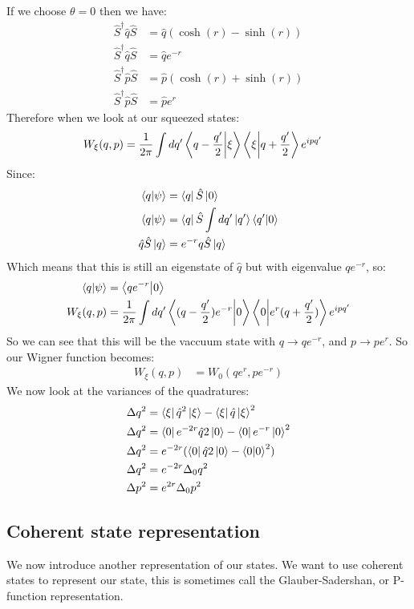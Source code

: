 If we choose $\theta = 0$ then we have:
\begin{align*}
	\hat{S}^\dagger \hat{q}\hat{S} &= \hat{q}(\cosh(r) - \sinh(r)) \\
	\hat{S}^\dagger \hat{q}\hat{S} &= \hat{q}e^{-r} \\
	\hat{S}^\dagger \hat{p}\hat{S} &= \hat{p}(\cosh(r) + \sinh(r)) \\
	\hat{S}^\dagger \hat{p}\hat{S} &= \hat{p}e^r
\end{align*}
Therefore when we look at our squeezed states:
\begin{align*}
	W_\xi(q,p) &= \frac{1}{2\pi}\int dq' \bra{q-\frac{q'}{2}}\ket{\xi}\bra{\xi}\ket{q + \frac{q'}{2}} e^{ipq'}
\end{align*}
Since:
\begin{align*}
	\bra{q}\ket{\psi} &= \bra{q}\hat{S}\ket{0} \\
	\bra{q}\ket{\psi} &= \bra{q}\hat{S}\int dq'\ket{q'}\bra{q'}\ket{0} \\
	\hat{q}\hat{S}\ket{q} &= e^{-r} q\hat{S}\ket{q}
\end{align*}
Which means that this is still an eigenstate of $\hat{q}$ but with eigenvalue $qe^{-r}$, so:
\begin{align*}
	\bra{q}\ket{\psi} &= \bra{q e^{-r}}\ket{0} \\
	W_\xi(q,p) &= \frac{1}{2\pi}\int dq' \bra{(q-\frac{q'}{2})e^{-r}}\ket{0}\bra{0}\ket{e^{r}(q + \frac{q'}{2})} e^{ipq'}
\end{align*}
So we can see that this will be the vaccuum state with $q\to qe^{-r}$, and $p\to pe^{r}$. So our Wigner function becomes:
\begin{align*}
	W_\xi(q,p) &= W_0(qe^{r},pe^{-r})
\end{align*}
We now look at the variances of the quadratures:
\begin{align*}
	\Delta q^2 &= \bra{\xi}\hat{q}^2\ket{\xi} - \bra{\xi}\hat{q}\ket{\xi}^2 \\
	\Delta q^2 &= \bra{0}e^{-2r}\hat{q}2\ket{0} - \bra{0}e^{-r}\ket{0}^2 \\
	\Delta q^2 &= e^{-2r}(\bra{0}\hat{q}2\ket{0} - \bra{0}\ket{0}^2) \\
	\Delta q^2 &= e^{-2r}\Delta_0 q^2 \\
	\Delta p^2 &= e^{2r}\Delta_0 p^2
\end{align*}

\subsection{Coherent state representation}
We now introduce another representation of our states. We want to use coherent states to represent our state, this is sometimes call the Glauber-Sadershan, or P-function representation.

